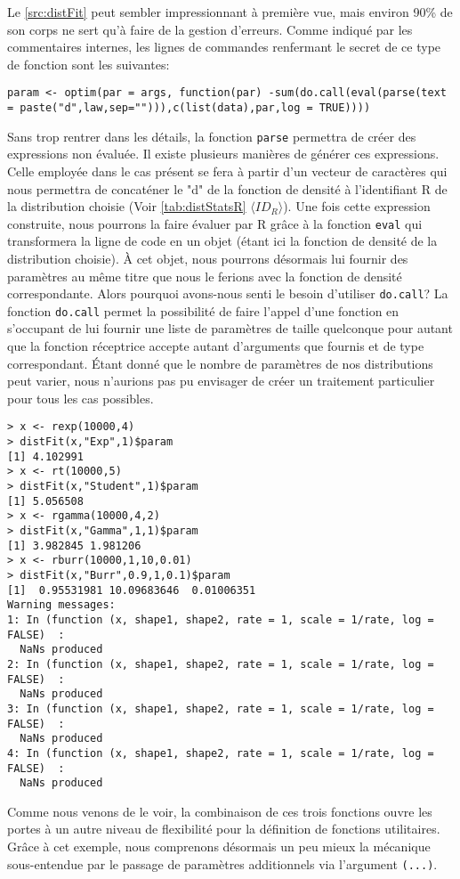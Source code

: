 Le \autoref{src:distFit} peut sembler impressionnant à première vue, mais environ 90\% de son corps ne sert qu'à faire de la gestion d'erreurs. Comme indiqué par les commentaires internes, les lignes de commandes renfermant le secret de ce type de fonction sont les suivantes: \\

\begin{minipage}{\linewidth}
	\noindent
	\texttt{param <- optim(par = args, function(par) -sum(do.call(eval(parse(text = paste("d",law,sep=""))),c(list(data),par,log = TRUE))))}
\end{minipage}

\vspace{\baselineskip}
Sans trop rentrer dans les détails, la fonction \texttt{parse} permettra de créer des expressions non évaluée. Il existe plusieurs manières de générer ces expressions. Celle employée dans le cas présent se fera à partir d'un vecteur de caractères qui nous permettra de concaténer le "d" de la fonction de densité à l'identifiant R de la distribution choisie (Voir \autoref{tab:distStatsR} $\langle ID_R \rangle$). Une fois cette expression construite, nous pourrons la faire évaluer par R grâce à la fonction \texttt{eval} qui transformera la ligne de code en un objet (étant ici la fonction de densité de la distribution choisie). À cet objet, nous pourrons désormais lui fournir des paramètres au même titre que nous le ferions avec la fonction de densité correspondante. Alors pourquoi avons-nous senti le besoin d'utiliser \texttt{do.call}? La fonction \texttt{do.call} permet la possibilité de faire l'appel d'une fonction en s'occupant de lui fournir une liste de paramètres de taille quelconque pour autant que la fonction réceptrice accepte autant d'arguments que fournis et de type correspondant. Étant donné que le nombre de paramètres de nos distributions peut varier, nous n'aurions pas pu envisager de créer un traitement particulier pour tous les cas possibles.

\begin{lstlisting}[caption = Exemple d'utilisation de la fonction \texttt{distFit},label=src:distFistEx]
> x <- rexp(10000,4)
> distFit(x,"Exp",1)$param
[1] 4.102991
> x <- rt(10000,5)
> distFit(x,"Student",1)$param
[1] 5.056508
> x <- rgamma(10000,4,2)
> distFit(x,"Gamma",1,1)$param
[1] 3.982845 1.981206
> x <- rburr(10000,1,10,0.01)
> distFit(x,"Burr",0.9,1,0.1)$param
[1]  0.95531981 10.09683646  0.01006351
Warning messages:
1: In (function (x, shape1, shape2, rate = 1, scale = 1/rate, log = FALSE)  :
  NaNs produced
2: In (function (x, shape1, shape2, rate = 1, scale = 1/rate, log = FALSE)  :
  NaNs produced
3: In (function (x, shape1, shape2, rate = 1, scale = 1/rate, log = FALSE)  :
  NaNs produced
4: In (function (x, shape1, shape2, rate = 1, scale = 1/rate, log = FALSE)  :
  NaNs produced
\end{lstlisting}

Comme nous venons de le voir, la combinaison de ces trois fonctions ouvre les portes à un autre niveau de flexibilité pour la définition de fonctions utilitaires. Grâce à cet exemple, nous comprenons désormais un peu mieux la mécanique sous-entendue par le passage de paramètres additionnels via l'argument \texttt{(...)}.